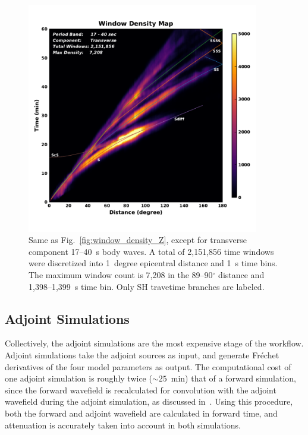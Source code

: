 \documentclass[extra,mreferee]{gji}
\begin{document}
\begin{figure}
  \centering
  \includegraphics[width=0.9\textwidth]{figures/window_colorbar_linear_T.pdf}
  \caption{\small{Same as Fig.~\ref{fig:window_density_Z}, except for transverse component 17--40~s body waves.
   A total of 2,151,856 time windows were discretized into 1~degree epicentral distance and 1~s time bins.
   The maximum window count is 7,208 in the 89--90$^\circ$ distance and 1,398--1,399~s time bin.
   Only SH travetime branches are labeled.}}
  \label{fig:window_density_T}
\end{figure}


\subsection{Adjoint Simulations}

Collectively,
the adjoint simulations are the most expensive stage of the workflow. 
Adjoint simulations take the adjoint sources as input, and generate Fr\'echet
derivatives of the four model parameters as output.
The computational cost of one adjoint simulation is roughly twice ($\sim25$~min) that of
a forward simulation, since the forward wavefield is recalculated for convolution with
the adjoint wavefield during the adjoint simulation,
as discussed in~\cite{KoXiBoPeSaLiTr16}.
Using this procedure,
both the forward and adjoint wavefield are calculated in forward time,
and attenuation is accurately taken into account in both simulations.
\end{document}
